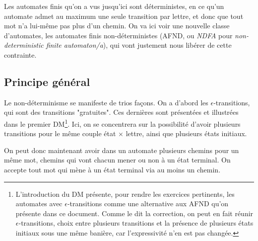 Les automates finis qu'on a vus jusqu'ici sont déterministes, en ce qu'un automate admet au maximum une seule transition par lettre, et donc que tout mot n'a lui-même pas plus d'un chemin. On va ici voir une nouvelle classe d'automates, les automates finis non-déterministes (AFND, ou \textit{NDFA} pour \textit{non-deterministic finite automaton/a}), qui vont justement nous libérer de cette contrainte.

\subsection{Principe général}

Le non-déterminisme se manifeste de trios façons. On a d'abord les $\epsilon$-transitions, qui sont des transitions "gratuites". Ces dernières sont présentées et illustrées dans le premier DM\footnote{L'introduction du DM présente, pour rendre les exercices pertinents, les automates avec $\epsilon$-transitions comme une alternative aux AFND qu'on présente dans ce document. Comme le dit la correction, on peut en fait réunir $\epsilon$-transitions, choix entre plusieurs transitions et la présence de plusieurs états initiaux sous une même banière, car l'expressivité n'en est pas changée.}. Ici, on se concentrera sur la possibilité d'avoir plusieurs transitions pour le même couple état $\times$ lettre, ainsi que plusieurs états initiaux.

On peut donc maintenant avoir dans un automate plusieurs chemins pour un même mot, chemins qui vont chacun mener ou non à un état terminal. On accepte tout mot qui mène à un état terminal via au moins un chemin.

